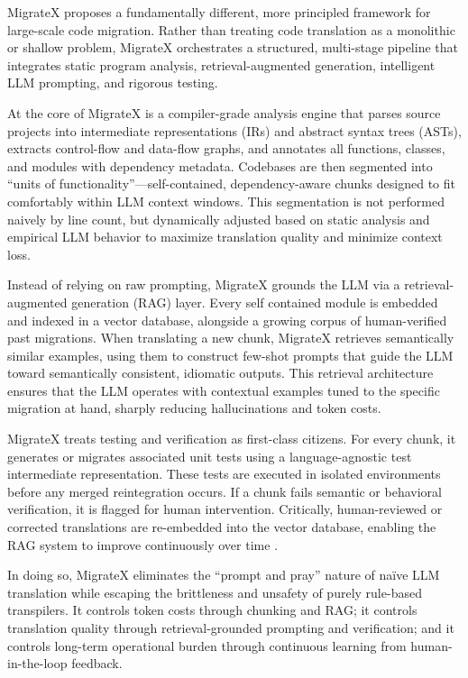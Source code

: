 \documentclass[twocolumn]{article}
\begin{document}
MigrateX proposes a fundamentally different, more principled framework for large-scale code migration. Rather than treating code translation as a monolithic or shallow problem, MigrateX orchestrates a structured, multi-stage pipeline that integrates static program analysis, retrieval-augmented generation, intelligent LLM prompting, and rigorous testing.

At the core of MigrateX is a compiler-grade analysis engine that parses source projects into intermediate representations (IRs) and abstract syntax trees (ASTs), extracts control-flow and data-flow graphs, and annotates all functions, classes, and modules with dependency metadata. Codebases are then segmented into ``units of functionality''---self-contained, dependency-aware chunks designed to fit comfortably within LLM context windows. This segmentation is not performed naively by line count, but dynamically adjusted based on static analysis and empirical LLM behavior to maximize translation quality and minimize context loss.

Instead of relying on raw prompting, MigrateX grounds the LLM via a retrieval-augmented generation (RAG) layer. Every self contained module is embedded and indexed in a vector database, alongside a growing corpus of human-verified past migrations. When translating a new chunk, MigrateX retrieves semantically similar examples, using them to construct few-shot prompts that guide the LLM toward semantically consistent, idiomatic outputs. This retrieval architecture ensures that the LLM operates with contextual examples tuned to the specific migration at hand, sharply reducing hallucinations and token costs.

MigrateX treats testing and verification as first-class citizens. For every chunk, it generates or migrates associated unit tests using a language-agnostic test intermediate representation. These tests are executed in isolated environments before any merged reintegration occurs. If a chunk fails semantic or behavioral verification, it is flagged for human intervention. Critically, human-reviewed or corrected translations are re-embedded into the vector database, enabling the RAG system to improve continuously over time \cite{silva2023repairllama} \cite{bhattarai2024enhancing}.

In doing so, MigrateX eliminates the ``prompt and pray'' nature of naïve LLM translation while escaping the brittleness and unsafety of purely rule-based transpilers. It controls token costs through chunking and RAG; it controls translation quality through retrieval-grounded prompting and verification; and it controls long-term operational burden through continuous learning from human-in-the-loop feedback.
\end{document}
